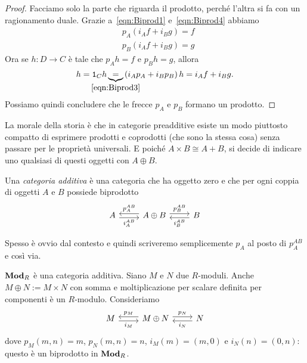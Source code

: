 \begin{proof}
  Facciamo solo la parte che riguarda il prodotto, perché l'altra si fa
  con un ragionamento duale. Grazie a~\eqref{eqn:Biprod1}
  e~\eqref{eqn:Biprod4} abbiamo
  \begin{align*}
    & p_A \left( i_A f + i_B g \right) = f \\
    & p_B \left( i_A f + i_B g \right) = g
  \end{align*}
  Ora se \(h : D \to C\) è tale che \(p_A h = f\) e \(p_B h = g\),
  allora
  \[
    h = \id_C h \underbrace{=}_{\mathclap{\eqref{eqn:Biprod3}}} \left(
      i_A p_A + i_B p_B \right) h = i_A f + i_B g .
  \]
  Possiamo quindi concludere che le frecce \(p_A\) e \(p_B\) formano un
  prodotto.
\end{proof}

La morale della storia è che in categorie preadditive esiste un modo
piuttosto compatto di esprimere prodotti e coprodotti (che sono la
stessa cosa) senza passare per le proprietà universali. E poiché
\(A \times B \cong A + B\), si decide di indicare uno qualsiasi di
questi oggetti con \(A \oplus B\).

\begin{definition}
  Una {\em categoria additiva} è una categoria che ha oggetto zero e che
  per ogni coppia di oggetti \(A\) e \(B\) possiede biprodotto
  \[
    \begin{tikzcd}
      A \ar["{i_A^{AB}}", r, shift right, swap] & A \oplus B
      \ar["{p_A^{AB}}", l, shift right, swap] \ar["{p_B^{AB}}", r, shift
      left] & B \ar["{i_B^{AB}}", l, shift left]
    \end{tikzcd}
  \]
\end{definition}

Spesso è ovvio dal contesto e quindi scriveremo semplicemente \(p_A\) al
posto di \(p_A^{AB}\) e così via.

\begin{example}
  \(\mathbf{Mod}_R\) è una categoria additiva. Siano \(M\) e \(N\) due
  \(R\)-moduli. Anche \(M \oplus N := M \times N\) con somma e moltiplicazione per
  scalare definita per componenti è un \(R\)-modulo. Consideriamo
  \[
    \begin{tikzcd}
      M \ar["{i_M}", r, shift right, swap] & M \oplus N
      \ar["{p_M}", l, shift right, swap] \ar["{p_N}", r, shift
      left] & N \ar["{i_N}", l, shift left]
    \end{tikzcd}
  \]
  dove \(p_M(m, n) = m\), \(p_N(m, n) = n\), \(i_M (m) = (m, 0)\) e
  \(i_N(n) = (0, n)\): questo è un biprodotto in \(\mathbf{Mod}_R\).
\end{example}

